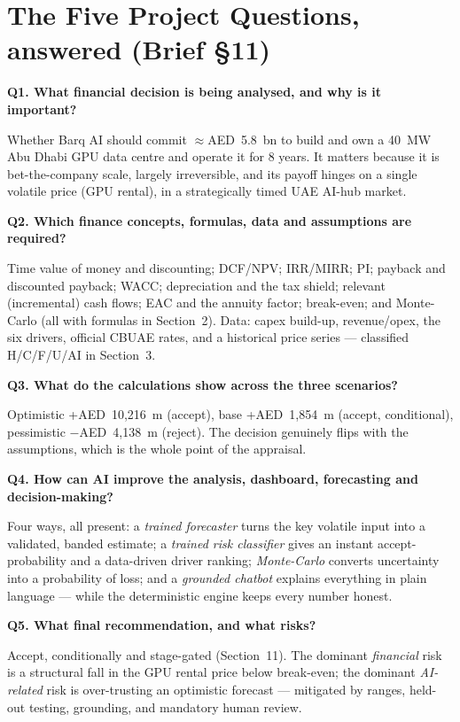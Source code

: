\documentclass[11pt,a4paper]{article}
\newcommand{\q}[1]{\medskip\noindent\textbf{#1}\par\nobreak}
\begin{document}
\section{The Five Project Questions, answered (Brief \S11)}

\q{Q1. What financial decision is being analysed, and why is it important?}
Whether Barq AI should commit $\approx$AED~5.8~bn to build and own a 40~MW Abu Dhabi GPU data centre
and operate it for 8 years. It matters because it is bet-the-company scale, largely irreversible, and
its payoff hinges on a single volatile price (GPU rental), in a strategically timed UAE AI-hub market.

\q{Q2. Which finance concepts, formulas, data and assumptions are required?}
Time value of money and discounting; DCF/NPV; IRR/MIRR; PI; payback and discounted payback; WACC;
depreciation and the tax shield; relevant (incremental) cash flows; EAC and the annuity factor;
break-even; and Monte-Carlo (all with formulas in Section~2). Data: capex build-up, revenue/opex,
the six drivers, official CBUAE rates, and a historical price series --- classified H/C/F/U/AI in
Section~3.

\q{Q3. What do the calculations show across the three scenarios?}
Optimistic +AED~10{,}216~m (accept), base +AED~1{,}854~m (accept, conditional), pessimistic
$-$AED~4{,}138~m (reject). The decision genuinely flips with the assumptions, which is the whole point
of the appraisal.

\q{Q4. How can AI improve the analysis, dashboard, forecasting and decision-making?}
Four ways, all present: a \emph{trained forecaster} turns the key volatile input into a validated,
banded estimate; a \emph{trained risk classifier} gives an instant accept-probability and a
data-driven driver ranking; \emph{Monte-Carlo} converts uncertainty into a probability of loss; and a
\emph{grounded chatbot} explains everything in plain language --- while the deterministic engine keeps
every number honest.

\q{Q5. What final recommendation, and what risks?}
Accept, conditionally and stage-gated (Section~11). The dominant \emph{financial} risk is a structural
fall in the GPU rental price below break-even; the dominant \emph{AI-related} risk is over-trusting an
optimistic forecast --- mitigated by ranges, held-out testing, grounding, and mandatory human review.

\end{document}
